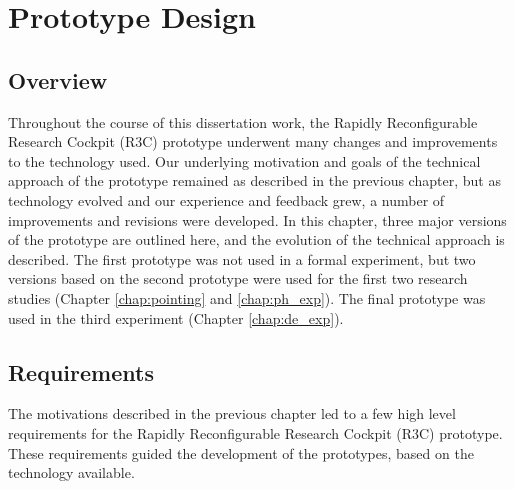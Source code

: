 \chapter{Prototype Design}
\label{chap:prototype}

\section{Overview}

Throughout the course of this dissertation work, the Rapidly Reconfigurable Research Cockpit (R3C) prototype underwent many changes and improvements to the technology used.
Our underlying motivation and goals of the technical approach of the prototype remained as described in the previous chapter, but as technology evolved and our experience and feedback grew, a number of improvements and revisions were developed.
In this chapter, three major versions of the prototype are outlined here, and the evolution of the technical approach is described.
The first prototype was not used in a formal experiment, but two versions based on the second prototype were used for the first two research studies (Chapter \ref{chap:pointing} and \ref{chap:ph_exp}).
The final prototype was used in the third experiment (Chapter \ref{chap:de_exp}).

\section{Requirements}

The motivations described in the previous chapter led to a few high level requirements for the Rapidly Reconfigurable Research Cockpit (R3C) prototype.
These requirements guided the development of the prototypes, based on the technology available.

